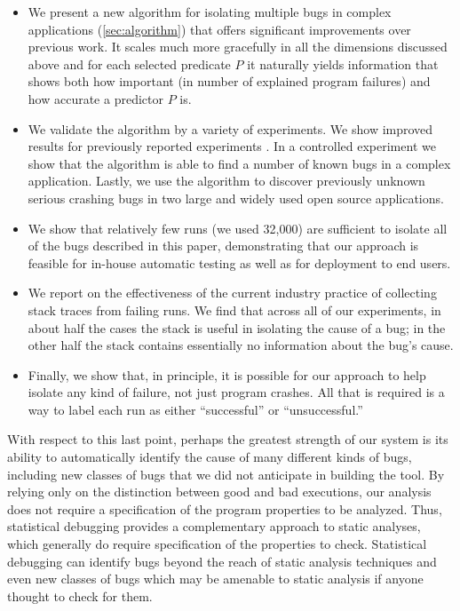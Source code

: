 \documentclass[draft]{sig-alternate}
\begin{document}
\begin{itemize}

\item We present a new algorithm for isolating multiple bugs in
complex applications (\autoref{sec:algorithm})
that offers significant improvements over previous work.
It scales much more gracefully in all the dimensions discussed above
and for each selected predicate $P$ it naturally yields information
that shows both how important (in number of explained program
failures) and how accurate a predictor $P$ is.

\item We validate the algorithm by a variety of experiments.  We show
improved results for previously reported experiments
\cite{PLDI`03*141}.  In a
controlled experiment we show that the algorithm is able to find a
number of known bugs in a complex application.  Lastly, we use
the algorithm to discover previously unknown serious crashing bugs in
two large and widely used open source applications.

\item We show that relatively few runs (we used 32,000) are sufficient
to isolate all of the bugs described in this paper, demonstrating that our
approach is feasible for in-house automatic testing as well as for
deployment to end users.

\item We report on the effectiveness of the current industry practice
of collecting stack traces from failing runs.  We find that across all
of our experiments, in about half the cases the stack is useful in
isolating the cause of a bug; in the other half the stack contains
essentially no information about the bug's cause.

\item Finally, we show that, in principle, it is possible for our
approach to help isolate any kind of failure, not just program
crashes.  All that is required is a way to label each run as either
``successful'' or ``unsuccessful.''

\end{itemize}

With respect to this last point, perhaps the greatest strength of our
system is its ability to automatically identify the cause of many
different kinds of bugs, including new classes of bugs that we did not
anticipate in building the tool.  By relying only on the distinction
between good and bad executions, our analysis does not require a
specification of the program properties to be analyzed.  Thus,
statistical debugging provides a complementary approach to static
analyses, which generally do require specification of the properties
to check.  Statistical debugging can identify bugs beyond the reach of
static analysis techniques and even new classes of bugs which may be
amenable to static analysis if anyone thought to check for them.
\end{document}
